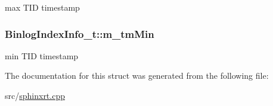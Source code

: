 max T\-I\-D timestamp 

\hypertarget{structBinlogIndexInfo__t_a464295839609038c27049e8e2ae9f75a}{
\subsubsection[{m\-\_\-tm\-Min}]{ Binlog\-Index\-Info\-\_\-t\-::m\-\_\-tm\-Min}}\label{structBinlogIndexInfo__t_a464295839609038c27049e8e2ae9f75a}


min T\-I\-D timestamp 



The documentation for this struct was generated from the following file\-:\begin{DoxyCompactItemize}
\item 
src/\hyperlink{sphinxrt_8cpp}{sphinxrt.\-cpp}\end{DoxyCompactItemize}

